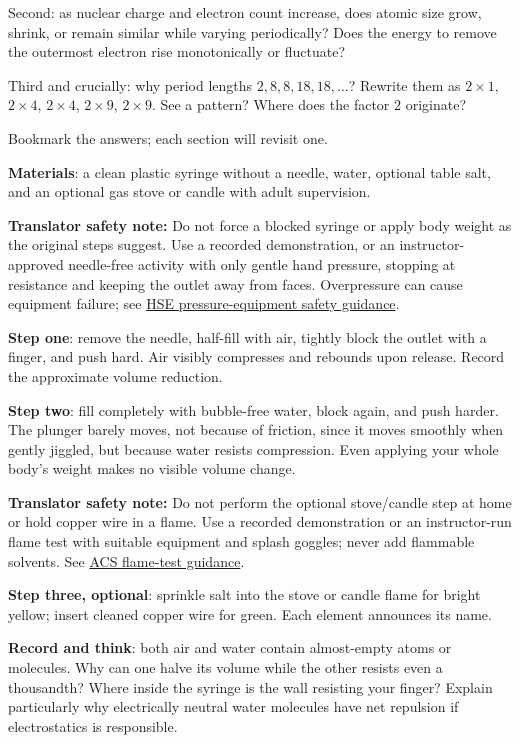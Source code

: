 Second: as nuclear charge and electron count increase, does atomic size grow, shrink, or remain similar while varying periodically? Does the energy to remove the outermost electron rise monotonically or fluctuate?

Third and crucially: why period lengths \(2,8,8,18,18,\dots\)? Rewrite them as \(2\times1\), \(2\times4\), \(2\times4\), \(2\times9\), \(2\times9\). See a pattern? Where does the factor \(2\) originate?

Bookmark the answers; each section will revisit one.


\begin{experiment}
\textbf{Materials}: a clean plastic syringe without a needle, water, optional table salt, and an optional gas stove or candle with adult supervision.

\textbf{Translator safety note:} Do not force a blocked syringe or apply body weight as the original steps suggest. Use a recorded demonstration, or an instructor-approved needle-free activity with only gentle hand pressure, stopping at resistance and keeping the outlet away from faces. Overpressure can cause equipment failure; see \href{https://www.hse.gov.uk/pressure-systems/about.htm}{HSE pressure-equipment safety guidance}.

\textbf{Step one}: remove the needle, half-fill with air, tightly block the outlet with a finger, and push hard. Air visibly compresses and rebounds upon release. Record the approximate volume reduction.

\textbf{Step two}: fill completely with bubble-free water, block again, and push harder. The plunger barely moves, not because of friction, since it moves smoothly when gently jiggled, but because water resists compression. Even applying your whole body's weight makes no visible volume change.

\textbf{Translator safety note:} Do not perform the optional stove/candle step at home or hold copper wire in a flame. Use a recorded demonstration or an instructor-run flame test with suitable equipment and splash goggles; never add flammable solvents. See \href{https://institute.acs.org/acs-center/lab-safety/education-training/safer-experiments/flame-test.html}{ACS flame-test guidance}.

\textbf{Step three, optional}: sprinkle salt into the stove or candle flame for bright yellow; insert cleaned copper wire for green. Each element announces its name.

\textbf{Record and think}: both air and water contain almost-empty atoms or molecules. Why can one halve its volume while the other resists even a thousandth? Where inside the syringe is the wall resisting your finger? Explain particularly why electrically neutral water molecules have net repulsion if electrostatics is responsible.
\end{experiment}

